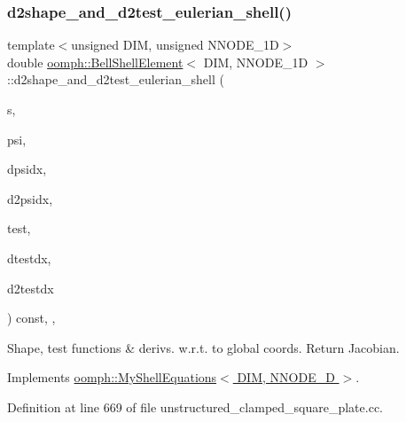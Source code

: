 \subsubsection{\texorpdfstring{d2shape\+\_\+and\+\_\+d2test\+\_\+eulerian\+\_\+shell()}{d2shape\_and\_d2test\_eulerian\_shell()}}
{\footnotesize\ttfamily template$<$unsigned D\+IM, unsigned N\+N\+O\+D\+E\+\_\+1D$>$ \\
double \hyperlink{classoomph_1_1BellShellElement}{oomph\+::\+Bell\+Shell\+Element}$<$ D\+IM, N\+N\+O\+D\+E\+\_\+1D $>$\+::d2shape\+\_\+and\+\_\+d2test\+\_\+eulerian\+\_\+shell (\begin{DoxyParamCaption}\item[{const Vector$<$ double $>$ \&}]{s,  }\item[{Shape \&}]{psi,  }\item[{D\+Shape \&}]{dpsidx,  }\item[{D\+Shape \&}]{d2psidx,  }\item[{Shape \&}]{test,  }\item[{D\+Shape \&}]{dtestdx,  }\item[{D\+Shape \&}]{d2testdx }\end{DoxyParamCaption}) const\hspace{0.3cm}{\ttfamily [inline]}, {\ttfamily [protected]}, {\ttfamily [virtual]}}



Shape, test functions \& derivs. w.\+r.\+t. to global coords. Return Jacobian. 



Implements \hyperlink{classoomph_1_1MyShellEquations_ae5efd29cb214218d41d29abab4dcec51}{oomph\+::\+My\+Shell\+Equations$<$ D\+I\+M, N\+N\+O\+D\+E\+\_\+D $>$}.



Definition at line 669 of file unstructured\+\_\+clamped\+\_\+square\+\_\+plate.\+cc.

\mbox{\label{classoomph_1_1BellShellElement_a56fcbf1446e8797e3066c802140d5baf}} 

